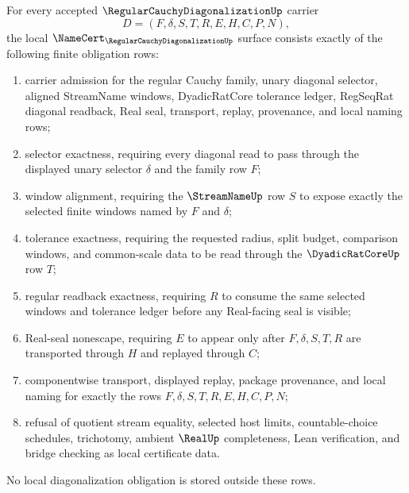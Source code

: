 \begin{theorem}
\label{thm:regular-cauchy-diagonalization-namecert-obligations}
For every accepted $\RegularCauchyDiagonalizationUp$ carrier
$$
D=(F,\delta,S,T,R,E,H,C,P,N),
$$
the local $\NameCert_{\RegularCauchyDiagonalizationUp}$ surface consists exactly of the following finite obligation rows:
\begin{enumerate}
\item carrier admission for the regular Cauchy family, unary diagonal selector, aligned StreamName windows, DyadicRatCore tolerance ledger, RegSeqRat diagonal readback, Real seal, transport, replay, provenance, and local naming rows;
\item selector exactness, requiring every diagonal read to pass through the displayed unary selector $\delta$ and the family row $F$;
\item window alignment, requiring the $\StreamNameUp$ row $S$ to expose exactly the selected finite windows named by $F$ and $\delta$;
\item tolerance exactness, requiring the requested radius, split budget, comparison windows, and common-scale data to be read through the $\DyadicRatCoreUp$ row $T$;
\item regular readback exactness, requiring $R$ to consume the same selected windows and tolerance ledger before any Real-facing seal is visible;
\item Real-seal nonescape, requiring $E$ to appear only after $F,\delta,S,T,R$ are transported through $H$ and replayed through $C$;
\item componentwise transport, displayed replay, package provenance, and local naming for exactly the rows $F,\delta,S,T,R,E,H,C,P,N$;
\item refusal of quotient stream equality, selected host limits, countable-choice schedules, trichotomy, ambient $\RealUp$ completeness, Lean verification, and bridge checking as local certificate data.
\end{enumerate}
No local diagonalization obligation is stored outside these rows.
\end{theorem}
